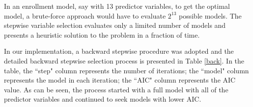 \documentclass[12pt,english]{report}
\begin{document}
In an enrollment model, say with 13 predictor variables, to get the optimal
model, a brute-force approach would have to evaluate $2^{13}$ possible models.
The stepwise variable selection evaluates only a limited number of models and
presents a heuristic solution to the problem in a fraction of time.

In our implementation, a backward stepwise procedure was adopted and the
detailed backward stepwise selection process is presented in Table \ref{back}.
In the table, the ``step" column represents the number of iterations; the
``model" column represents the model in each iteration; the ``AIC" column
represents the AIC value.  As can be seen, the process started with a full
model with all of the predictor variables and continued to seek models with
lower AIC.



\end{document}
